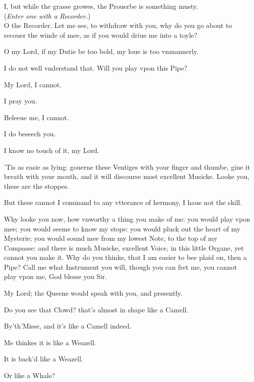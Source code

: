 \documentclass[a5paper,DIV=calc,11pt]{scrbook}
\begin{document}
\begin{drama*}
    \hamspeaks I, but while the grasse growes, the Prouerbe is something musty.\\
    (\textit{Enter one with a Recorder.})\\
    O the Recorder. Let me see, to withdraw with you, why do you go about to recouer the winde of mee, as if you would driue me into a toyle?
    
    \guilspeaks O my Lord, if my Dutie be too bold, my loue is too vnmannerly.
    
    \hamspeaks I do not well vnderstand that. Will you play vpon this Pipe?
    
    \guilspeaks My Lord, I cannot.
    
    \hamspeaks I pray you.
    
    \guilspeaks Beleeue me, I cannot.
    
    \hamspeaks I do beseech you.
    
    \guilspeaks I know no touch of it, my Lord.
    
    \hamspeaks 'Tis as easie as lying: gouerne these Ventiges with your finger and thumbe, giue it breath with your mouth, and it will discourse most excellent Musicke. Looke you, these are the stoppes.
    
    \guilspeaks But these cannot I command to any vtterance of hermony, I haue not the skill.
    
    \hamspeaks Why looke you now, how vnworthy a thing you make of me: you would play vpon mee; you would seeme to know my stops: you would pluck out the heart of my Mysterie; you would sound mee from my lowest Note, to the top of my Compasse: and there is much Musicke, excellent Voice, in this little Organe, yet cannot you make it. Why do you thinke, that I am easier to bee plaid on, then a Pipe? Call me what Instrument you will, though you can fret me, you cannot play vpon me, God blesse you Sir.
    
    
    \polspeaks My Lord; the Queene would speak with you, and presently.
    
    \hamspeaks Do you see that Clowd? that's almost in shape like a Camell.
    
    \polspeaks By'th'Misse, and it's like a Camell indeed.
    
    \hamspeaks Me thinkes it is like a Weazell.
    
    \polspeaks It is back'd like a Weazell.
    
    \hamspeaks Or like a Whale?
    

\end{drama*}
\end{document}
